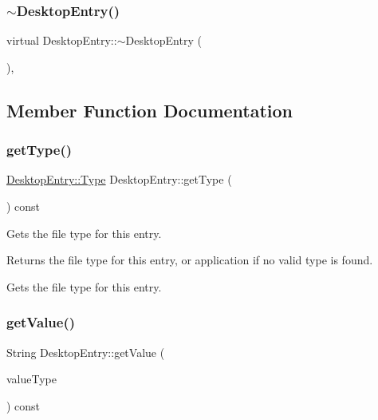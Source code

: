 \subsubsection{\texorpdfstring{$\sim$\+Desktop\+Entry()}{~DesktopEntry()}}
{\footnotesize\ttfamily virtual Desktop\+Entry\+::$\sim$\+Desktop\+Entry (\begin{DoxyParamCaption}{ }\end{DoxyParamCaption})\hspace{0.3cm}{\ttfamily [inline]}, {\ttfamily [virtual]}}



\subsection{Member Function Documentation}
\mbox{\label{classDesktopEntry_acfc8f1a763cea3b4918b279c953fc2ed}} 
\subsubsection{\texorpdfstring{get\+Type()}{getType()}}
{\footnotesize\ttfamily \mbox{\hyperlink{classDesktopEntry_ae14c5446e35cfe8ecdfb37d0523aa899}{Desktop\+Entry\+::\+Type}} Desktop\+Entry\+::get\+Type (\begin{DoxyParamCaption}{ }\end{DoxyParamCaption}) const}

Gets the file type for this entry.

\begin{DoxyReturn}{Returns}
the file type for this entry, or application if no valid type is found.
\end{DoxyReturn}
Gets the file type for this entry. \mbox{\label{classDesktopEntry_a5325bc41e9ccf0b7574974b01c7e110c}} 
\subsubsection{\texorpdfstring{get\+Value()}{getValue()}\hspace{0.1cm}{\footnotesize\ttfamily [1/3]}}
{\footnotesize\ttfamily String Desktop\+Entry\+::get\+Value (\begin{DoxyParamCaption}\item[{\mbox{\hyperlink{classDesktopEntry_a299e7c10728312fda6daf9ff926e3355}{String\+Value}}}]{value\+Type }\end{DoxyParamCaption}) const}

